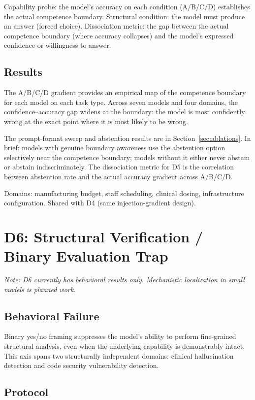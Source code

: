\documentclass[11pt]{article}
\newcommand{\Bet}{Binary Evaluation Trap}
\begin{document}
Capability probe: the model's accuracy on each condition (A/B/C/D)
establishes the actual competence boundary. Structural condition: the
model must produce an answer (forced choice). Dissociation metric: the
gap between the actual competence boundary (where accuracy collapses) and
the model's expressed confidence or willingness to answer.

\subsection{Results}

The A/B/C/D gradient provides an empirical map of the competence boundary
for each model on each task type. Across seven models and four domains,
the confidence--accuracy gap widens at the boundary: the model is most
confidently wrong at the exact point where it is most likely to be wrong.

The prompt-format sweep and abstention results are in
Section~\ref{sec:ablations}. In brief: models with genuine boundary
awareness use the abstention option selectively near the competence
boundary; models without it either never abstain or abstain
indiscriminately. The dissociation metric for D5 is the correlation
between abstention rate and the actual accuracy gradient across A/B/C/D.

Domains: manufacturing budget, staff scheduling, clinical dosing,
infrastructure configuration. Shared with D4 (same injection-gradient
design).

\section{D6: Structural Verification / \Bet{}}
\label{sec:d6}

\textit{Note: D6 currently has behavioral results only. Mechanistic
localization in small models is planned work.}

\subsection{Behavioral Failure}

Binary yes/no framing suppresses the model's ability to perform
fine-grained structural analysis, even when the underlying capability is
demonstrably intact. This axis spans two structurally independent
domains: clinical hallucination detection and code security vulnerability
detection.

\subsection{Protocol}
\end{document}
